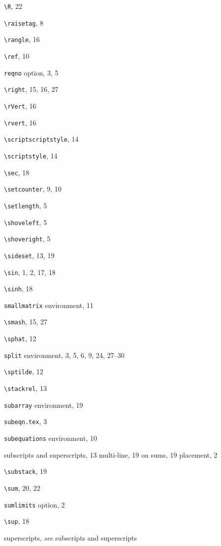 \documentclass[leqno,titlepage,openany]{amsldoc}[1999/12/13]
\providecommand{\see}[2]{\textit{see} #1}
\begin{document}
\begin{theindex}
  \indexspace

  \item \verb*+\R+, 22
  \item \verb*+\raisetag+, 8
  \item \verb*+\rangle+, 16
  \item \verb*+\ref+, 10
  \item \texttt{reqno} option, 3, 5
  \item \verb*+\right+, 15, 16, 27
  \item \verb*+\rVert+, 16
  \item \verb*+\rvert+, 16

  \indexspace

  \item \verb*+\scriptscriptstyle+, 14
  \item \verb*+\scriptstyle+, 14
  \item \verb*+\sec+, 18
  \item \verb*+\setcounter+, 9, 10
  \item \verb*+\setlength+, 5
  \item \verb*+\shoveleft+, 5
  \item \verb*+\shoveright+, 5
  \item \verb*+\sideset+, 13, 19
  \item \verb*+\sin+, 1, 2, 17, 18
  \item \verb*+\sinh+, 18
  \item \texttt{smallmatrix} environment, 11
  \item \verb*+\smash+, 15, 27
  \item \verb*+\sphat+, 12
  \item \texttt{split} environment, 3, 5, 6, 9, 24, 27--30
  \item \verb*+\sptilde+, 12
  \item \verb*+\stackrel+, 13
  \item \texttt{subarray} environment, 19
  \item \texttt{subeqn.tex}, 3
  \item \texttt{subequations} environment, 10
  \item subscripts and superscripts, 13
    \subitem multi-line, 19
    \subitem on sums, 19
    \subitem placement, 2
  \item \verb*+\substack+, 19
  \item \verb*+\sum+, 20, 22
  \item \texttt{sumlimits} option, 2
  \item \verb*+\sup+, 18
  \item superscripts, \see{subscripts and superscripts}{19}


\end{theindex}
\end{document}
